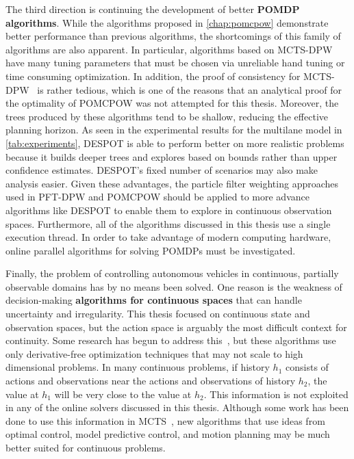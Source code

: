 The third direction is continuing the development of better \textbf{POMDP algorithms}.
While the algorithms proposed in \cref{chap:pomcpow} demonstrate better performance than previous algorithms, the shortcomings of this family of algorithms are also apparent.
In particular, algorithms based on MCTS-DPW have many tuning parameters that must be chosen via unreliable hand tuning or time consuming optimization.
In addition, the proof of consistency for MCTS-DPW~\cite{auger2013continuous} is rather tedious, which is one of the reasons that an analytical proof for the optimality of POMCPOW was not attempted for this thesis.
Moreover, the trees produced by these algorithms tend to be shallow, reducing the effective planning horizon.
As seen in the experimental results for the multilane model in \cref{tab:experiments}, DESPOT is able to perform better on more realistic problems because it builds deeper trees and explores based on bounds rather than upper confidence estimates.
DESPOT's fixed number of scenarios may also make analysis easier.
Given these advantages, the particle filter weighting approaches used in PFT-DPW and POMCPOW should be applied to more advance algorithms like DESPOT to enable them to explore in continuous observation spaces.
Furthermore, all of the algorithms discussed in this thesis use a single execution thread. In order to take advantage of modern computing hardware, online parallel algorithms for solving POMDPs must be investigated.

Finally, the problem of controlling autonomous vehicles in continuous, partially observable domains has by no means been solved.
One reason is the weakness of decision-making \textbf{algorithms for continuous spaces} that can handle uncertainty and irregularity.
This thesis focused on continuous state and observation spaces, but the action space is arguably the most difficult context for continuity.
Some research has begun to address this~\cite{seiler2015online,wang2018online}, but these algorithms use only derivative-free optimization techniques that may not scale to high dimensional problems.
In many continuous problems, if history $h_1$ consists of actions and observations near the actions and observations of history $h_2$, the value at $h_1$ will be very close to the value at $h_2$.
This information is not exploited in any of the online solvers discussed in this thesis.
Although some work has been done to use this information in MCTS~\cite{xiao2018memory}, new algorithms that use ideas from optimal control, model predictive control, and motion planning may be much better suited for continuous problems.
